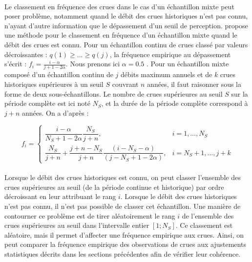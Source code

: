 		\paragraph{} Le classement en fréquence des crues dans le cas d'un échantillon mixte peut poser problème, notamment quand le débit des crues historiques n'est pas connu, n'ayant d'autre information que le dépassement d'un seuil de perception. \citet{hirsch_probability_1987} propose une méthode pour le classement en fréquence d'un échantillon mixte quand le débit des crues est connu. Pour un échantillon continu de crues classé par valeurs décroissantes : $q(1) \geq ... \geq q(j)$, la fréquence empirique au dépassement s'écrit : $f_i = \frac{i-\alpha}{j+1-2\alpha}$. Nous prenons ici $\alpha = 0.5$ \citep{hazen_storage_1914}. Pour un échantillon mixte composé d'un échantillon continu de $j$ débits maximum annuels et de $k$ crues historiques supérieures à un seuil $S$ couvrant $n$ années, il faut raisonner sous la forme de deux sous-échantillons. Le nombre de crues supérieures au seuil $S$ sur la période complète est ici noté $N_S$, et la durée de la période complète correspond à $j + n$ années. On a d'après \citet{hirsch_probability_1987} :
		
		\begin{equation}	
		f_i = \begin{cases}\dfrac{i-\alpha}{N_S+1-2 \alpha} \dfrac{N_S}{j+n}, & i=1, \ldots, N_S \\ \dfrac{N_S}{j+n}+\dfrac{j+n-N_S}{j+n} \dfrac{(i-N_S-\alpha)}{(j-N_S+1-2\alpha)}, & i=N_S+1, \ldots, j+k\end{cases}
		\label{eq:FreqHisto}	
		\end{equation}
%	
%		
	
	\paragraph{} Lorsque le débit des crues historiques est connu, on peut classer l'ensemble des crues supérieures au seuil (de la période continue et historique) par ordre décroissant en leur attribuant le rang $i$. Lorsque le débit des crues historiques n'est pas connu, il n'est pas possible de classer cet échantillon. Une manière de contourner ce problème est de tirer aléatoirement le rang $i$ de l'ensemble des crues supérieures au seuil dans l'intervalle entier $\left[1;N_S\right]$. Ce classement est aléatoire, mais il permet d'affecter une fréquence empirique aux crues. Ainsi, on peut comparer la fréquence empirique des observations de crues aux ajustements statistiques décrits dans les sections précédentes afin de vérifier leur cohérence. 
		
